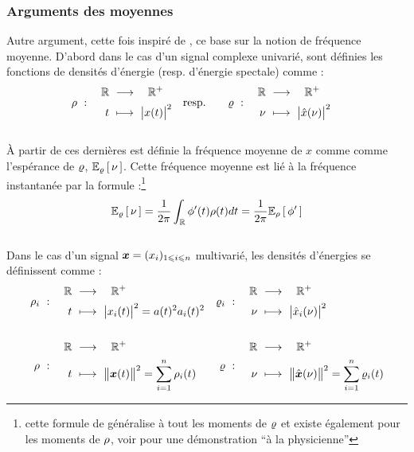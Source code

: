 \subsubsection*{Arguments des moyennes}

Autre argument, cette fois inspiré de \cite{cano_mathematical_2022}, ce base sur la notion de fréquence moyenne.
D'abord dans le cas d'un signal complexe univarié, sont définies les fonctions de densités d'énergie (resp. d'énergie spectale) comme :
\begin{align}\label{eq:densi_dE}
	\densit\ &:\quad \begin{aligned}\R\ &\lr\quad \R^+ \\ t\ &\longmapsto\ \big|x(t)\big|^2 \end{aligned}  
	&
	\text{resp.}\qquad \densis\ &:\quad \begin{aligned}\R\ &\lr\quad \R^+ \\ \nu\ &\longmapsto\ \big|\fou{x}(\nu)\big|^2 \end{aligned}
\end{align}
\\
À partir de ces dernières est définie la fréquence moyenne de $x$ comme comme l'espérance de $\densis$, $\esp[\densis]{\nu}$. Cette fréquence moyenne est lié à la fréquence instantanée par la formule :\footnote{cette formule de généralise à tout les moments de $\densis$ et existe également pour les moments de $\densit$, voir \cite[sec. 1.4]{cohen_time_1995} pour une démonstration ``à la physicienne'' }
\begin{equation}\label{eq:esp_freq}
	\esp[\densis]{\nu} = \frac{1}{2\pi}\int_\R \phi'(t)\densit(t)dt = \frac{1}{2\pi} \esp[\densit]{\phi'}
\end{equation}
\\
Dans le cas d'un signal $\x=(x_i)_{1\leq i\leq n}$ multivarié, les densités d'énergies se définissent comme :
\begin{align*}%
	\densit_i\ &:\quad \begin{aligned}\R\ &\lr\quad \R^+ \\ t\ &\longmapsto\ \big|x_i(t)\big|^2 = a(t)^2 a_i(t)^2 \end{aligned}  
	&
	\densis_i\ &:\quad \begin{aligned}\R\ &\lr\quad \R^+ \\ \nu\ &\longmapsto\ \big|\fou{x}_i(\nu)\big|^2 \end{aligned} \\ \\
	\densit\ &:\quad \begin{aligned}\R\ &\lr\quad \R^+ \\ t\ &\longmapsto\ \big\|\x(t)\big\|^2 = \sum_{i=1}^n \densit_i(t) \end{aligned}  
	&
	\densis\ &:\quad \begin{aligned}\R\ &\lr\quad \R^+ \\ \nu\ &\longmapsto\ \big\|\fou{\x}(\nu)\big\|^2 = \sum_{i=1}^n \densis_i(t) \end{aligned}	
\end{align*}
